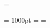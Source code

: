 \newcount\@lowpenalty
\newcount\@medpenalty
\newcount\@highpenalty









\@maxdepth       = \maxdepth


\vsize = 1000pt
\@colroom = \vsize
\@colht = \vsize
